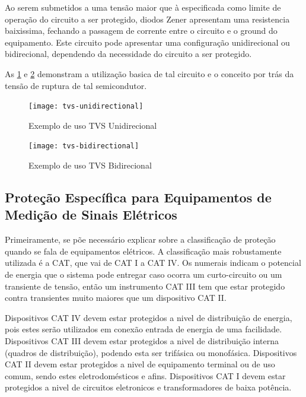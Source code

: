     Ao serem submetidos a uma tensão maior que à especificada como limite de operação do circuito a ser protegido, diodos Zener apresentam uma resistencia baixissima, fechando a passagem de corrente entre o circuito e o ground do equipamento. Este circuito pode apresentar uma configuração unidirecional ou bidirecional, dependendo da necessidade do circuito a ser protegido. 
    
    As \ref{fig:tvsUnidirecional} e \ref{fig:tvsBidirecional} demonstram a utilização basica de tal circuito e o conceito por trás da tensão de ruptura de tal semicondutor.

    \begin{figure}[htb]%
        \caption{Exemplo de uso TVS Unidirecional}%
        \label{fig:tvsUnidirecional}%
        \texttt{[image: tvs-unidirectional]}%
    \end{figure}

    \begin{figure}[htb]%
        \caption{Exemplo de uso TVS Bidirecional}%
        \label{fig:tvsBidirecional}%
        \texttt{[image: tvs-bidirectional]}%
    \end{figure}

    \subsection{Proteção Específica para Equipamentos de Medição de Sinais Elétricos}\label{subsec:especProtec}

    Primeiramente, se põe necessário explicar sobre a classificação de proteção quando se fala de equipamentos elétricos. A classificação mais robustamente utilizada é a CAT, que vai de CAT I a CAT IV. Os numerais indicam o potencial de energia que o sistema pode entregar caso ocorra um curto-circuito ou um transiente de tensão, então um instrumento CAT III tem que estar protegido contra transientes muito maiores que um dispositivo CAT II. 

    Dispositivos CAT IV devem estar protegidos a nivel de distribuição de energia, pois estes serão utilizados em conexão entrada de energia de uma facilidade. Dispositivos CAT III devem estar protegidos a nivel de distribuição interna (quadros de distribuição), podendo esta ser trifásica ou monofásica. Dispositivos CAT II devem estar protegidos a nivel de equipamento terminal ou de uso comum, sendo estes eletrodomésticos e afins. Dispositivos CAT I devem estar protegidos a nivel de circuitos eletronicos e transformadores de baixa potência. %

